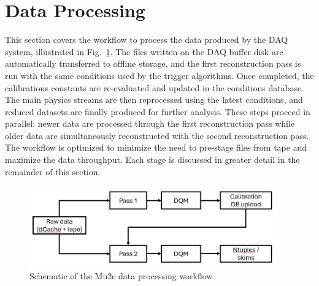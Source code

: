 \section{Data Processing}
\label{sec:dataProc}

This section covers the workflow to process the data produced by the DAQ system, illustrated in Fig.~\ref{fig:workflow}. The files written on the DAQ buffer disk are automatically transferred to offline storage, and the first reconstruction pass is run with the same conditions used by the trigger algorithms. Once completed, the calibrations constants are re-evaluated and updated in the conditions database. The main physics streams are then reprocessed using the latest conditions, and reduced datasets are finally produced for further analysis. These steps proceed in parallel: newer data are processed through the first reconstruction pass while older data are simultaneously reconstructed with the second reconstruction pass. The workflow is optimized to minimize the need to pre-stage files from tape and maximize the data throughput. Each stage is discussed in greater detail in the remainder of this section. 

\begin{figure}[ht!]
  \centering
  \includegraphics[width=0.95\textwidth]{figures/WorkflowOverview.png}
  \caption{Schematic of the Mu2e data processing workflow}
  \label{fig:workflow}
\end{figure}


